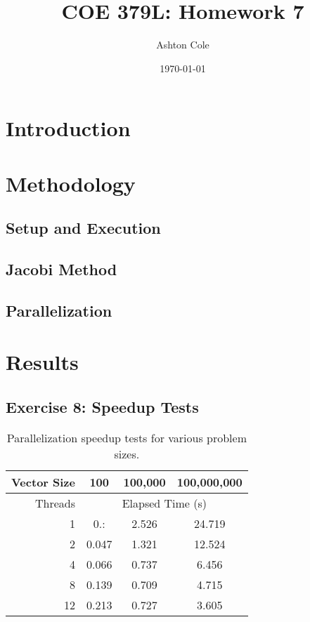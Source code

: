 \documentclass{article}
\title{COE 379L: Homework 7}
\author{Ashton Cole}
\date{\today}
\begin{document}
\maketitle

\section{Introduction}

\section{Methodology}

\subsection{Setup and Execution}

\subsection{Jacobi Method}

\subsection{Parallelization}

\section{Results}

\subsection{Exercise 8: Speedup Tests}

\begin{table}[h!]
	\centering
	\caption{Parallelization speedup tests for various problem sizes.}
	\label{tbl:speedup}
	\begin{tabular}{r|ccc}
		Vector Size & 100 & 100,000 & 100,000,000 \\
		\hline
		Threads & \multicolumn{3}{c}{Elapsed Time (s)} \\
		\hline
		1 & 0.: & 2.526 & 24.719 \\
		2 & 0.047 & 1.321 & 12.524 \\
		4 & 0.066 & 0.737 & 6.456 \\
		8 & 0.139 & 0.709 & 4.715 \\
		12 & 0.213 & 0.727 & 3.605
	\end{tabular}
\end{table}
\end{document}

